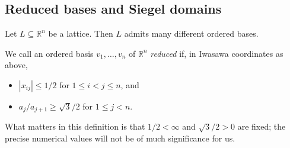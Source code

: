 \documentclass[reqno]{amsart} 
\begin{document}
\subsection{Reduced bases and Siegel domains} \label{sec:org0d39d27}
Let $L \subseteq \mathbb{R}^n$ be a lattice.  Then ${L}$ admits many different ordered bases.
\begin{definition}
  We call an ordered basis $v_1,\dotsc,v_n$ of $\mathbb{R}^n$ \emph{reduced} if, in Iwasawa coordinates as above,
  \begin{itemize}
  \item $|x_{i j}| \leq 1/2$ for $1 \leq i < j \leq n$, and
  \item $a_{j} / a_{j+1} \geq \sqrt{3}/2$ for $1 \leq j < n$.
  \end{itemize}
\end{definition}
What matters in this definition is that $1/2 < \infty$ and $\sqrt{3}/2 > 0$ are fixed; the precise numerical values will not be of much significance for us.
\end{document}
